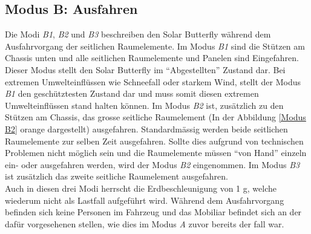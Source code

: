 \subsection{Modus B: Ausfahren}
Die Modi \emph{B1}, \emph{B2} und \emph{B3} beschreiben den Solar Butterfly während dem Ausfahrvorgang der seitlichen Raumelemente. Im Modus \emph{B1} sind die Stützen am Chassis unten und alle seitlichen Raumelemente und Panelen sind Eingefahren. Dieser Modus stellt den Solar Butterfly im ``Abgestellten'' Zustand dar. Bei extremen Umwelteinflüssen wie Schneefall oder starkem Wind, stellt der Modus \emph{B1} den geschütztesten Zustand dar und muss somit diesen extremen Umwelteinflüssen stand halten können.
Im Modus \emph{B2} ist, zusätzlich zu den Stützen am Chassis, das grosse seitliche Raumelement (In der Abbildung \ref{Modus B2} orange dargestellt) ausgefahren. Standardmässig werden beide seitlichen Raumelemente zur selben Zeit ausgefahren. Sollte dies aufgrund von technischen Problemen nicht möglich sein und die Raumelemente müssen ``von Hand'' einzeln ein- oder ausgefahren werden, wird der Modus \emph{B2} eingenommen. Im Modus \emph{B3} ist zusätzlich das zweite seitliche Raumelement ausgefahren.\\
Auch in diesen drei Modi herrscht die Erdbeschleunigung von 1 g, welche wiederum nicht als Lastfall aufgeführt wird. Während dem Ausfahrvorgang befinden sich keine Personen im Fahrzeug und das Mobiliar befindet sich an der dafür vorgesehenen stellen, wie dies im Modus \emph{A} zuvor bereits der fall war.

